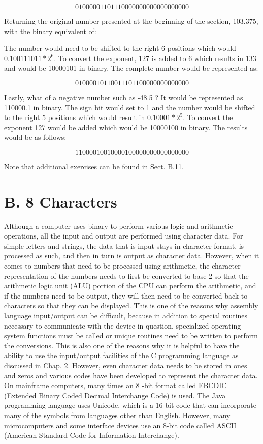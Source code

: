 \documentclass[10pt]{article}
\begin{document}
$$
01000001101110000000000000000000
$$

Returning the original number presented at the beginning of the section, 103.375, with the binary equivalent of:

The number would need to be shifted to the right 6 positions which would $0.100111011 * 2^{6}$. To convert the exponent, 127 is added to 6 which results in 133 and would be 10000101 in binary. The complete number would be represented as:

$$
01000010110011101100000000000000
$$

Lastly, what of a negative number such as -48.5 ? It would be represented as 110000.1 in binary. The sign bit would set to 1 and the number would be shifted to the right 5 positions which would result in $0.10001 * 2^{5}$. To convert the exponent 127 would be added which would be 10000100 in binary. The results would be as follows:

$$
11000010010000100000000000000000
$$

Note that additional exercises can be found in Sect. B.11.

\section*{B. 8 Characters}
Although a computer uses binary to perform various logic and arithmetic operations, all the input and output are performed using character data. For simple letters and strings, the data that is input stays in character format, is processed as such, and then in turn is output as character data. However, when it comes to numbers that need to be processed using arithmetic, the character representation of the numbers needs to first be converted to base 2 so that the arithmetic logic unit (ALU) portion of the CPU can perform the arithmetic, and if the numbers need to be output, they will then need to be converted back to characters so that they can be displayed. This is one of the reasons why assembly language input/output can be difficult, because in addition to special routines necessary to communicate with the device in question, specialized operating system functions must be called or unique routines need to be written to perform the conversions. This is also one of the reasons why it is helpful to have the ability to use the input/output facilities of the C programming language as discussed in Chap. 2. However, even character data needs to be stored in ones and zeros and various codes have been developed to represent the character data. On mainframe computers, many times an 8 -bit format called EBCDIC (Extended Binary Coded Decimal Interchange Code) is used. The Java programming language uses Unicode, which is a 16-bit code that can incorporate many of the symbols from languages other than English. However, many microcomputers and some interface devices use an 8-bit code called ASCII (American Standard Code for Information Interchange).
\end{document}
